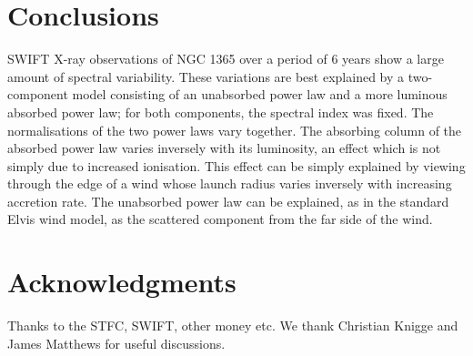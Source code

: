 \documentclass[useAMS,usenatbib]{sam}
\begin{document}
\section{Conclusions}

SWIFT X-ray observations of NGC 1365 over a period of 6 years show a large amount of spectral variability. These variations are best explained by a two-component model
consisting of an unabsorbed power law and a more luminous absorbed power law; for both components, the spectral index was fixed. The normalisations of the two power laws
vary together. The absorbing column of the absorbed power law varies inversely with its luminosity, an effect which is not simply due to increased ionisation. This effect
can be simply explained by viewing through the edge of a wind whose launch radius varies inversely with increasing accretion rate. The unabsorbed power law can be
explained, as in the standard Elvis wind model, as the scattered component from the far side of the wind.

\section*{Acknowledgments}

Thanks to the STFC, SWIFT, other money etc. We thank Christian Knigge and James Matthews for useful discussions.

\end{document}
